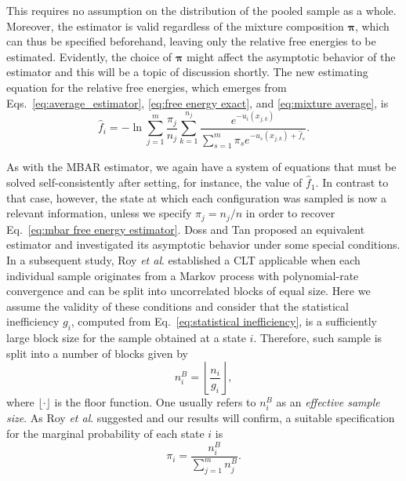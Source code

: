 \documentclass[aip,jcp,reprint,amsmath,amssymb]{revtex4-1}
\newcommand{\vt}[1]{\boldsymbol{\mathbf{#1}}}           %
\begin{document}
This requires no assumption on the distribution of the pooled sample as a whole. Moreover, the estimator is valid regardless of the mixture composition $\vt \pi$, which can thus be specified beforehand, leaving only the relative free energies to be estimated. Evidently, the choice of $\vt \pi$ might affect the asymptotic behavior of the estimator and this will be a topic of discussion shortly. The new estimating equation for the relative free energies, which emerges from Eqs.~\eqref{eq:average_estimator}, \eqref{eq:free energy exact}, and \eqref{eq:mixture average}, is
\begin{equation}
\label{eq:mblock free energy estimator}
{\hat f}_i = -\ln \sum_{j=1}^m \frac{\pi_j}{n_j} \sum_{k=1}^{n_j} \frac{e^{-u_i(x_{j,k})}}{\sum_{s=1}^m \pi_s e^{-u_s(x_{j,k}) + {\hat f}_s}}.
\end{equation}

As with the MBAR estimator, we again have a system of equations that must be solved self-consistently after setting, for instance, the value of $\hat f_1$. In contrast to that case, however, the state at which each configuration was sampled is now a relevant information, unless we specify $\pi_j = {n_j}/{n}$ in order to recover Eq.~\eqref{eq:mbar free energy estimator}. Doss and Tan\cite{Doss_2014} proposed an equivalent estimator and investigated its asymptotic behavior under some special conditions. In a subsequent study, Roy \textit{et al}.\cite{Roy_2018} established a CLT applicable when each individual sample originates from a Markov process with polynomial-rate convergence and can be split into uncorrelated blocks of equal size. Here we assume the validity of these conditions and consider that the statistical inefficiency $g_i$, computed from Eq.~\eqref{eq:statistical inefficiency}, is a sufficiently large block size for the sample obtained at a state $i$. Therefore, such sample is split into a number of blocks given by
\begin{equation*}
\label{eq:mblock number of blocks}
n^B_i = \left\lfloor \frac{n_i}{g_i} \right\rfloor,
\end{equation*}
where $\lfloor \cdot \rfloor$ is the floor function. One usually refers to $n^B_i$ as an \textit{effective sample size}. As Roy \textit{et al}.\cite{Roy_2018} suggested and our results will confirm, a suitable specification for the marginal probability of each state $i$ is
\begin{equation}
\label{eq:mblock prior}
\pi_i = \frac{n^B_i}{\sum_{j=1}^m n^B_j}.
\end{equation}
\end{document}
